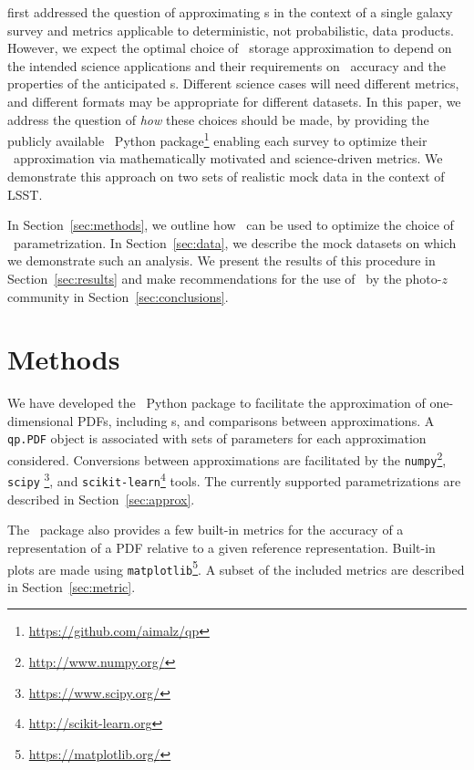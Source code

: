 \citet{carrasco_kind_sparse_2014} first addressed the question of approximating 
\pz s in the context of a single galaxy survey and metrics applicable to 
deterministic, not probabilistic, data products.
However, we expect the optimal choice of \pz\ storage approximation to depend 
on the intended science applications and their requirements on \pz\ accuracy 
and the properties of the anticipated \pz s.
Different science cases will need different metrics, and different formats may 
be appropriate for different datasets.
In this paper, we address the question of \textit{how} these choices should be 
made, by providing the publicly available \qp\ Python 
package\footnote{\url{https://github.com/aimalz/qp}} enabling each survey to 
optimize their \pz\ approximation via mathematically motivated and 
science-driven metrics.
We demonstrate this approach on two sets of realistic mock data in the context 
of LSST.

In Section~\ref{sec:methods}, we outline how \qp\ can be used to optimize the 
choice of \pz\ parametrization.
In Section~\ref{sec:data}, we describe the mock datasets on which we 
demonstrate such an analysis.
We present the results of this procedure in Section~\ref{sec:results} and make 
recommendations for the use of \qp\ by the photo-$z$ community in 
Section~\ref{sec:conclusions}.

\section{Methods}


We have developed the \qp\ Python package to facilitate the approximation of 
one-dimensional PDFs, including \pz s, and comparisons between approximations.
A \texttt{qp.PDF} object is associated with sets of parameters for each 
approximation considered.
Conversions between approximations are facilitated by the 
\texttt{numpy}\footnote{\url{http://www.numpy.org/}}, \texttt{scipy} 
\footnote{\url{https://www.scipy.org/}}, and 
\texttt{scikit-learn}\footnote{\url{http://scikit-learn.org}} 
\citep{pedregosa_scikit-learn:_2011} tools.
The currently supported parametrizations are described in 
Section~\ref{sec:approx}.

The \qp\ package also provides a few built-in metrics for the accuracy of a 
representation of a PDF relative to a given reference representation.
Built-in plots are made using 
\texttt{matplotlib}\footnote{\url{https://matplotlib.org/}}.
A subset of the included metrics are described in Section~\ref{sec:metric}.

